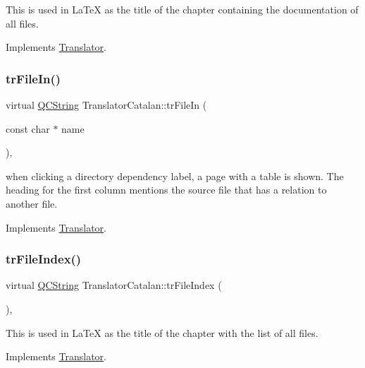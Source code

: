 This is used in La\+TeX as the title of the chapter containing the documentation of all files. 

Implements \mbox{\hyperlink{class_translator}{Translator}}.

\mbox{\label{class_translator_catalan_a74a36a31dcdc2bf207d97b5ea314c739}} 
\subsubsection{\texorpdfstring{trFileIn()}{trFileIn()}}
{\footnotesize\ttfamily virtual \mbox{\hyperlink{class_q_c_string}{Q\+C\+String}} Translator\+Catalan\+::tr\+File\+In (\begin{DoxyParamCaption}\item[{const char $\ast$}]{name }\end{DoxyParamCaption})\hspace{0.3cm}{\ttfamily [inline]}, {\ttfamily [virtual]}}

when clicking a directory dependency label, a page with a table is shown. The heading for the first column mentions the source file that has a relation to another file. 

Implements \mbox{\hyperlink{class_translator}{Translator}}.

\mbox{\label{class_translator_catalan_a5ee45be9a20728256e3da68ac4146f7f}} 
\subsubsection{\texorpdfstring{trFileIndex()}{trFileIndex()}}
{\footnotesize\ttfamily virtual \mbox{\hyperlink{class_q_c_string}{Q\+C\+String}} Translator\+Catalan\+::tr\+File\+Index (\begin{DoxyParamCaption}{ }\end{DoxyParamCaption})\hspace{0.3cm}{\ttfamily [inline]}, {\ttfamily [virtual]}}

This is used in La\+TeX as the title of the chapter with the list of all files. 

Implements \mbox{\hyperlink{class_translator}{Translator}}.

